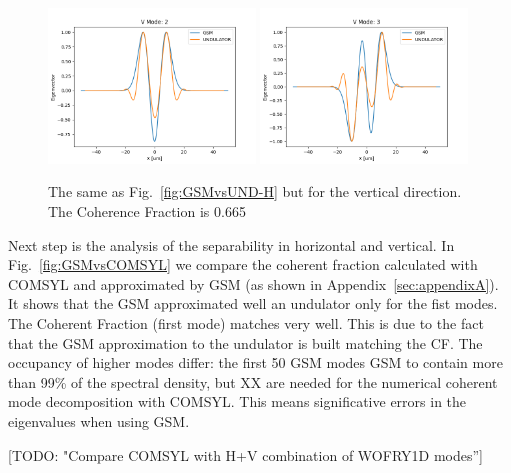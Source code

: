 \documentclass{iucr}              %
\newcommand{\todo}[1]{{\color{red}[TODO: "#1'']}}
\begin{document}
\begin{figure}
    \includegraphics[width=0.49\textwidth]{figures/comparison_V_eigenvector2.png}
    \includegraphics[width=0.49\textwidth]{figures/comparison_V_eigenvector3.png}
        
    \caption{The same as Fig.~\ref{fig:GSMvsUND-H} but for the vertical direction. The Coherence Fraction is 0.665}
    \label{fig:GSMvsUND-V}
\end{figure}



Next step is the analysis of the separability in horizontal and vertical. In Fig.~\ref{fig:GSMvsCOMSYL} we compare the coherent fraction calculated with COMSYL \cite{comsyl} and approximated by GSM (as shown in Appendix~\ref{sec:appendixA}). It shows that the GSM approximated well an undulator only for the fist modes. The Coherent Fraction (first mode) matches very well. This is due to the fact that the GSM approximation to the undulator is built matching the CF. The occupancy of higher modes differ: the first 50 GSM modes GSM to contain more than 99\% of the spectral density, but XX are needed for the numerical coherent mode decomposition with COMSYL. This means significative errors in the eigenvalues when using GSM. 

\todo{Compare COMSYL with H+V combination of WOFRY1D modes}
\end{document}
